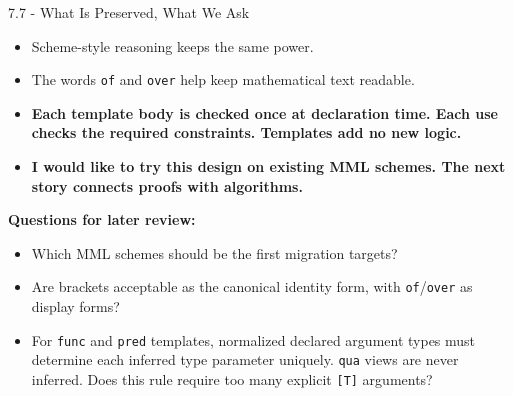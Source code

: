 \documentclass[aspectratio=169,11pt]{beamer}
\begin{document}
\begin{frame}[fragile,t]{7.7 - What Is Preserved, What We Ask}
\begin{itemize}
\setlength{\itemsep}{1pt}
\setlength{\parsep}{0pt}
\setlength{\parskip}{0pt}
\item Scheme-style reasoning keeps the same power.
\item The words \texttt{of} and \texttt{over} help keep mathematical text readable.
\item \textcolor{blue!55!black}{\textbf{Each template body is checked once at declaration time. Each use checks the required constraints. Templates add no new logic.}}
\item \textcolor{blue!55!black}{\textbf{I would like to try this design on existing MML schemes. The next story connects proofs with algorithms.}}
\end{itemize}
\smallskip
\textbf{Questions for later review:}
\begin{itemize}
\setlength{\itemsep}{1pt}
\setlength{\parsep}{0pt}
\setlength{\parskip}{0pt}
\item Which MML schemes should be the first migration targets?
\item Are brackets acceptable as the canonical identity form, with \texttt{of}/\texttt{over} as display forms?
\item For \texttt{func} and \texttt{pred} templates, normalized declared argument types must determine each inferred type parameter uniquely. \texttt{qua} views are never inferred. Does this rule require too many explicit \texttt{[T]} arguments?
\end{itemize}
\end{frame}
\end{document}
